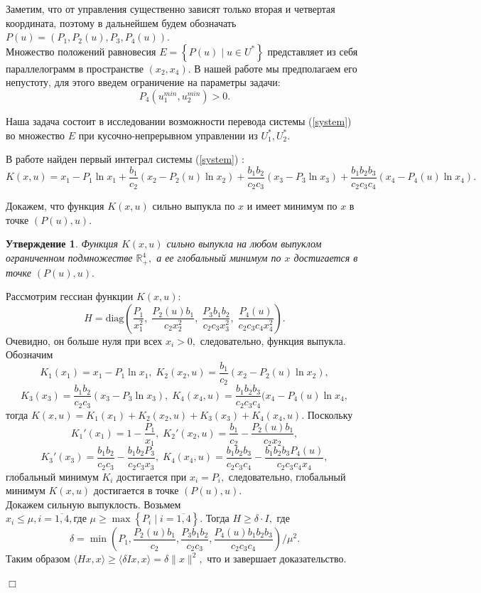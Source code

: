 \documentclass[11pt]{article}
\newtheorem{statement}{Утверждение}
\newenvironment{Proof}
{\par\noindent{\bf Доказательство.\\}} 
{\begin{flushright}$\Box$\end{flushright}}
\newcommand\Set[2]{\left\{ #1 \mid #2 \right\}}
\newcommand\Ref[1]{(\ref{#1})}
\newcommand\ftw[2]{\overline{#1,#2}}
\newcommand\RS{\Ref{system} }
\newcommand\beq{\begin{equation}}
\newcommand\eeq{\end{equation}}
\begin{document}
Заметим, что от управления существенно зависят только вторая и четвертая координата, поэтому в дальнейшем будем обозначать $P(u) = (P_1, P_2(u), P_3, P_4(u)).$ \\

Множество положений равновесия $E = \Set{P(u)}{u \in U^*}$ представляет из себя параллелограмм в пространстве $(x_2, x_4).$ В нашей работе мы предполагаем его непустоту, для этого введем ограничение на параметры задачи:
$$P_4(u_1^{min}, u_2^{min}) > 0.$$

Наша задача состоит в исследовании возможности перевода системы \RS во множество $E$ при кусочно-непрерывном управлении из $U_1^*, U_2^*.$ 

В работе \cite{MathBio} найден первый интеграл системы \RS:
\beq
	K(x,u) = x_1 - P_1\ln x_1 + \frac{b_1}{c_2}(x_2 - P_2(u)\ln x_2) + \frac{b_1b_2}{c_2c_3}(x_3 - P_3\ln x_3) + \frac{b_1b_2b_3}{c_2c_3c_4}(x_4 - P_4(u)\ln x_4).
\eeq

Докажем, что функция $K(x,u)$ сильно выпукла по $x$ и имеет минимум по $x$ в точке $(P(u),u).$

\begin{statement}
	Функция $K(x,u)$ сильно выпукла на любом выпуклом ограниченном подмножестве $\mathbb{R}_+^4,$ а ее глобальный минимум по $x$ достигается в точке $(P(u),u).$
\end{statement}
\begin{Proof}
	Рассмотрим гессиан функции $K(x,u):$
	$$H = \text{diag} \left(\frac{P_1}{x_1^2}, \; \frac{P_2(u)b_1}{c_2x_2^2}, \; \frac{P_3b_1b_2}{c_2c_3x_3^2}, \; \frac{P_4(u)}{c_2c_3c_4x_4^2}\right).$$
	Очевидно, он больше нуля при всех $x_i > 0,$ следовательно, функция выпукла.\\
	Обозначим 
	$$K_1(x_1) = x_1 - P_1\ln x_1, \; K_2(x_2,u) = \frac{b_1}{c_2}(x_2 - P_2(u)\ln x_2),$$
	$$K_3(x_3) = \frac{b_1b_2}{c_2c_3}(x_3 - P_3\ln x_3), \; K_4(x_4,u) = \frac{b_1b_2b_3}{c_2c_3c_4}(x_4 - P_4(u)\ln x_4,$$ тогда $K(x,u) =  K_1(x_1) + K_2(x_2,u) + K_3(x_3) + K_4(x_4,u).$  Поскольку 
	$$K_1'(x_1) = 1 - \frac{P_1}{x_1}, \; K_2'(x_2,u) = \frac{b_1}{c_2} - \frac{P_2(u)b_1}{c_2x_2},$$
	$$K_3'(x_3) = \frac{b_1b_2}{c_2c_3} - \frac{b_1b_2P_3}{c_2c_3x_3}, \; K_4(x_4,u) = \frac{b_1b_2b_3}{c_2c_3c_4} - \frac{b_1b_2b_3P_4(u)}{c_2c_3c_4x_4},$$ 
	глобальный минимум $K_i$ достигается при $x_i = P_i,$ следовательно, глобальный минимум $K(x,u)$ достигается в точке $(P(u),u).$ \\
	 Докажем сильную выпуклость. Возьмем $x_i \leqslant \mu, i = \ftw{1}{4}, \text{где } \mu \geqslant \max\Set{P_i}{i = \ftw{1}{4}}.$ Тогда $H \geqslant \delta\cdot I,$ где  
	 $$\delta = \min\left(P_1, \frac{P_2(u)b_1}{c_2}, \frac{P_3b_1b_2}{c_2c_3}, \frac{P_4(u)b_1b_2b_3}{c_2c_3c_4}\right)/\mu^2.$$
	 Таким образом $\langle Hx,x \rangle \geqslant \langle \delta Ix,x \rangle = \delta \|x\|^2,$ что и завершает доказательство.
\end{Proof}
\end{document}

